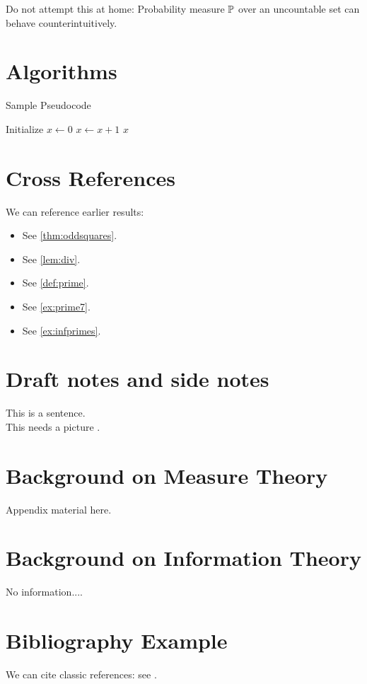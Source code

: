 \documentclass[11pt]{article}
\begin{document}
\begin{ddanger}
Do not attempt this at home: Probability measure $\mathbb{P}$ over an uncountable set
can behave counterintuitively.
\end{ddanger}

\DRAFT %

\section{Algorithms}
\begin{algorithm}
\caption{Sample Pseudocode}
\begin{algorithmic}[1]
\State Initialize $x \gets 0$
  \State $x \gets x+1$
\EndWhile
\State \Return $x$
\end{algorithmic}
\end{algorithm}

\section{Cross References}
We can reference earlier results:
\begin{itemize}[itemsep=2pt, topsep=2pt]
  \item See \autoref{thm:oddsquares}.
  \item See \autoref{lem:div}.
  \item See \autoref{def:prime}.
  \item See \autoref{ex:prime7}.
  \item See \autoref{ex:infprimes}.
\end{itemize}


\section{Draft notes and side notes}
This is a sentence.  \\
This needs a picture .

\newpage
\appendix
\section{Background on Measure Theory}
Appendix material here.

\section{Background on Information Theory}
No information....

\section{Bibliography Example}
We can cite classic references: see \cite{rudin1987real,cover2006elements}.

\newpage
\printbibliography
\end{document}
